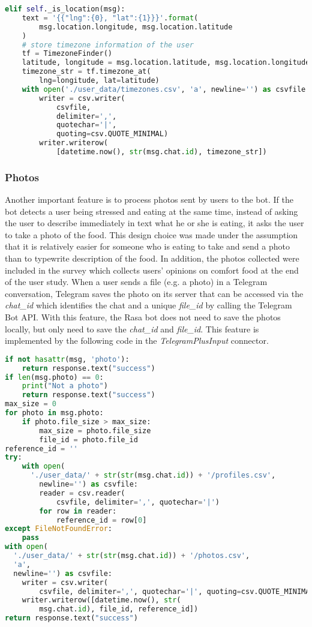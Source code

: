 \begin{lstlisting}[language=Python]
elif self._is_location(msg):
    text = '{{"lng":{0}, "lat":{1}}}'.format(
        msg.location.longitude, msg.location.latitude
    )
    # store timezone information of the user
    tf = TimezoneFinder()
    latitude, longitude = msg.location.latitude, msg.location.longitude
    timezone_str = tf.timezone_at(
        lng=longitude, lat=latitude)
    with open('./user_data/timezones.csv', 'a', newline='') as csvfile:
        writer = csv.writer(
            csvfile,
            delimiter=',',
            quotechar='|',
            quoting=csv.QUOTE_MINIMAL)
        writer.writerow(
            [datetime.now(), str(msg.chat.id), timezone_str])
\end{lstlisting}

\subsubsection{Photos}
Another important feature is to process photos sent by users to the bot. If the bot detects a user being stressed and eating at the same time, instead of asking the user to describe immediately in text what he or she is eating, it asks the user to take a photo of the food. This design choice was made under the assumption that it is relatively easier for someone who is eating to take and send a photo than to typewrite description of the food. In addition, the photos collected were included in the survey which collects users' opinions on comfort food at the end of the user study. When a user sends a file (e.g. a photo) in a Telegram conversation, Telegram saves the photo on its server that can be accessed via the \emph{chat\_id} which identifies the chat and a unique \emph{file\_id} by calling the Telegram Bot API. With this feature, the Rasa bot does not need to save the photos locally, but only need to save the \emph{chat\_id} and \emph{file\_id}. This feature is implemented by the following code in the \emph{TelegramPlusInput} connector. \bigskip

\begin{lstlisting}[language=Python]
if not hasattr(msg, 'photo'):
    return response.text("success")
if len(msg.photo) == 0:
    print("Not a photo")
    return response.text("success")
max_size = 0
for photo in msg.photo:
    if photo.file_size > max_size:
        max_size = photo.file_size
        file_id = photo.file_id
reference_id = ''
try:
    with open(
      './user_data/' + str(str(msg.chat.id)) + '/profiles.csv',
        newline='') as csvfile:
        reader = csv.reader(
            csvfile, delimiter=',', quotechar='|')
        for row in reader:
            reference_id = row[0]
except FileNotFoundError:
    pass
with open(
  './user_data/' + str(str(msg.chat.id)) + '/photos.csv',
  'a',
  newline='') as csvfile:
    writer = csv.writer(
        csvfile, delimiter=',', quotechar='|', quoting=csv.QUOTE_MINIMAL)
    writer.writerow([datetime.now(), str(
        msg.chat.id), file_id, reference_id])
return response.text("success")
\end{lstlisting}

